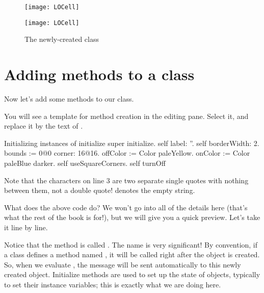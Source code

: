 \documentclass[a4paper,10pt,twoside]{book}
\begin{document}
\begin{figure}[h!t]
\ifluluelse
	{\centerline {\texttt{[image: LOCell]}}}
	{\centerline {\texttt{[image: LOCell]}}}
\caption{The newly-created class }
\end{figure}

\section{Adding methods to a class}

Now let's add some methods to our class.

You will see a template for method creation in the editing pane.
Select it, and replace it by the text of .

\begin{numMethod}[scbecellinitialize]{Initializing instances of }
initialize
   super initialize.
   self label: ''.
   self borderWidth: 2.
   bounds := 0@0 corner: 16@16.
   offColor := Color paleYellow.
   onColor := Color paleBlue darker.
   self useSquareCorners.
   self turnOff
\end{numMethod}

\noindent
Note that the characters  on line 3 are two separate single quotes with nothing between them, not a double quote!   denotes the empty string.


What does the above code do?  We won't go into all of the details here (that's what the rest of the book is for!), but we will give you a quick preview.  Let's take it line by line.

Notice that the method is called .
The name is very significant!
By convention, if a class defines a method named , it will be called right after the object is created.
So, when we evaluate , the message  will be sent automatically to this newly created object.
Initialize methods are used to set up the state of objects, typically to set their instance variables; this is exactly what we are doing here.
\end{document}
